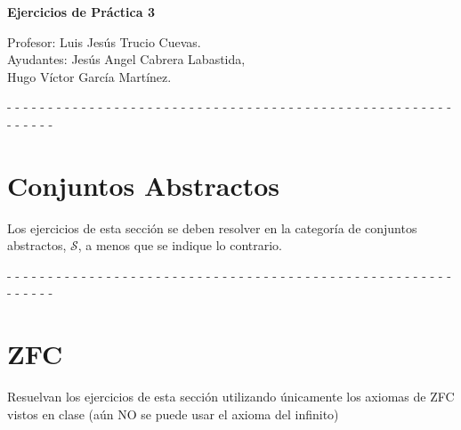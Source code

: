 \documentclass[12pt]{article}
\newcommand{\topos}[1]{\mathscr{#1}}
\begin{document}
    \begin{center}
      \Huge \textbf{Ejercicios de Práctica 3} \\
    \end{center}
    \begin{flushright}
      \footnotesize Profesor: Luis Jesús Trucio Cuevas.\\
      Ayudantes: Jesús Angel Cabrera Labastida,\\
      Hugo Víctor García Martínez.
    \end{flushright}
    \begin{center}
      - - - - - - - - - - - - - - - - - - - - - - - - - - - - - - - - - - - - -
      - - - - - - - - - - - - - - - - - - - - - - - 
    \end{center}
    \section*{Conjuntos Abstractos}
    Los ejercicios de esta sección se deben resolver en la categoría de
    conjuntos abstractos, \(\topos{S}\), a menos que se indique lo contrario.
    
    \begin{center}
      - - - - - - - - - - - - - - - - - - - - - - - - - - - - - - - - - - - - -
      - - - - - - - - - - - - - - - - - - - - - - - 
    \end{center}
    \section*{ZFC}
    Resuelvan los ejercicios de esta sección utilizando únicamente los axiomas
    de ZFC vistos en clase (aún NO se puede usar el axioma del infinito)
    
\end{document}
